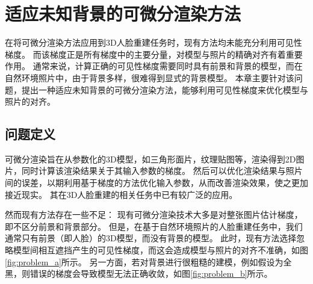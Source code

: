 \chapter{适应未知背景的可微分渲染方法}
\label{chap:method}

在将可微分渲染方法应用到3D人脸重建任务时，现有方法均未能充分利用可见性梯度。
而该梯度正是所有梯度中的主要分量，对模型与照片的精确对齐有着重要作用。
通常来说，计算正确的可见性梯度需要同时具有前景和背景的模型，而在自然环境照片中，由于背景多样，很难得到显式的背景模型。
本章主要针对该问题，提出一种适应未知背景的可微分渲染方法，能够利用可见性梯度来优化模型与照片的对齐。

\section{问题定义}

可微分渲染旨在从参数化的3D模型，如三角形面片，纹理贴图等，渲染得到2D图片，同时计算该渲染结果关于其输入参数的梯度。
然后可以优化渲染结果与照片间的误差，以期利用基于梯度的方法优化输入参数，从而改善渲染效果，使之更加接近现实。
其在3D人脸重建的相关任务中已有较广泛的应用。

然而现有方法存在一些不足：
现有可微分渲染技术大多是对整张图片估计梯度，即不区分前景和背景部分。
但是，在基于自然环境照片的人脸重建任务中，我们通常只有前景（即人脸）的3D模型，而没有背景的模型。
此时，现有方法选择忽略模型间相互遮挡产生的可见性梯度，而这会造成模型与照片的对齐不准确，如图\ref{fig:problem_a}所示。
另一方面，若对背景进行很粗糙的建模，例如假设为全黑，则错误的梯度会导致模型无法正确收敛，如图\ref{fig:problem_b}所示。


